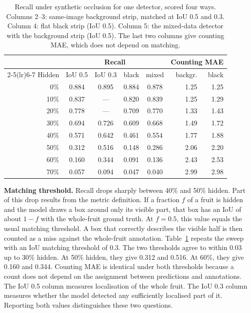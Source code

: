 \begin{table}[t]
\centering
\caption{Recall under synthetic occlusion for one detector, scored four ways.
Columns 2--3: same-image background strip, matched at IoU 0.5 and 0.3.
Column 4: flat black strip (IoU 0.5). Column 5: the mixed-data detector with
the background strip (IoU 0.5). The last two columns give counting MAE, which
does not depend on matching.}
\label{tab:occlusion-sweep}
\setlength{\tabcolsep}{4pt}
\begin{tabular}{rccccrr}
\toprule
& \multicolumn{4}{c}{Recall} & \multicolumn{2}{c}{Counting MAE}\\
\cmidrule(lr){2-5}\cmidrule(lr){6-7}
Hidden & IoU 0.5 & IoU 0.3 & black & mixed & backgr. & black \\
\midrule
0\%  & 0.884 & 0.895 & 0.884 & 0.878 & 1.25 & 1.25 \\
10\% & 0.837 & ---   & 0.820 & 0.839 & 1.25 & 1.29 \\
20\% & 0.778 & ---   & 0.709 & 0.770 & 1.33 & 1.43 \\
30\% & 0.694 & 0.726 & 0.609 & 0.668 & 1.49 & 1.72 \\
40\% & 0.571 & 0.642 & 0.461 & 0.554 & 1.77 & 1.88 \\
50\% & 0.312 & 0.516 & 0.148 & 0.286 & 2.06 & 2.20 \\
60\% & 0.160 & 0.344 & 0.091 & 0.136 & 2.43 & 2.53 \\
70\% & 0.057 & 0.094 & 0.047 & 0.040 & 2.99 & 2.98 \\
\bottomrule
\end{tabular}
\end{table}

\textbf{Matching threshold.} Recall drops sharply between 40\% and 50\%
hidden. Part of this drop results from the metric definition. If a fraction
$f$ of a fruit is hidden and the model draws a box around only its visible
part, that box has an IoU of about $1-f$ with the whole-fruit ground truth. At
$f=0.5$, this value equals the usual matching threshold. A box that correctly
describes the visible half is then counted as a miss against the whole-fruit
annotation. Table~\ref{tab:occlusion-sweep} repeats the sweep with an IoU
matching threshold of 0.3. The two thresholds agree to within 0.03 up to 30\%
hidden. At 50\% hidden, they give 0.312 and 0.516. At 60\%, they give 0.160 and
0.344. Counting MAE is identical under both thresholds because a count does
not depend on the assignment between predictions and annotations. The IoU 0.5
column measures localisation of the whole fruit. The IoU 0.3 column measures
whether the model detected any sufficiently localised part of it. Reporting
both values distinguishes these two questions.

